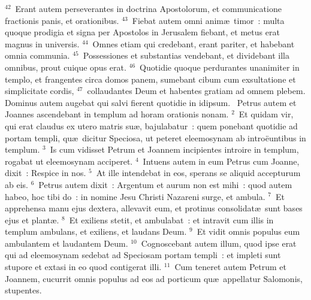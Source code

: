 ${}^{42}$~Erant autem perseverantes in doctrina Apostolorum, et communicatione fractionis panis, et orationibus.
${}^{43}$~Fiebat autem omni anim\ae\ timor~: multa quoque prodigia et signa per Apostolos in Jerusalem fiebant, et metus erat magnus in universis.
${}^{44}$~Omnes etiam qui credebant, erant pariter, et habebant omnia communia.
${}^{45}$~Possessiones et substantias vendebant, et dividebant illa omnibus, prout cuique opus erat.
${}^{46}$~Quotidie quoque perdurantes unanimiter in templo, et frangentes circa domos panem, sumebant cibum cum exsultatione et simplicitate cordis,
${}^{47}$~collaudantes Deum et habentes gratiam ad omnem plebem. Dominus autem augebat qui salvi fierent quotidie in idipsum.
~Petrus autem et Joannes ascendebant in templum ad horam orationis nonam.
${}^{2}$~Et quidam vir, qui erat claudus ex utero matris su\ae , bajulabatur~: quem ponebant quotidie ad portam templi, qu\ae\ dicitur Speciosa, ut peteret eleemosynam ab intro\"euntibus in templum.
${}^{3}$~Is cum vidisset Petrum et Joannem incipientes introire in templum, rogabat ut eleemosynam acciperet.
${}^{4}$~Intuens autem in eum Petrus cum Joanne, dixit~: Respice in nos.
${}^{5}$~At ille intendebat in eos, sperans se aliquid accepturum ab eis.
${}^{6}$~Petrus autem dixit~: Argentum et aurum non est mihi~: quod autem habeo, hoc tibi do~: in nomine Jesu Christi Nazareni surge, et ambula.
${}^{7}$~Et apprehensa manu ejus dextera, allevavit eum, et protinus consolidat\ae\ sunt bases ejus et plant\ae .
${}^{8}$~Et exiliens stetit, et ambulabat~: et intravit cum illis in templum ambulans, et exiliens, et laudans Deum.
${}^{9}$~Et vidit omnis populus eum ambulantem et laudantem Deum.
${}^{10}$~Cognoscebant autem illum, quod ipse erat qui ad eleemosynam sedebat ad Speciosam portam templi~: et impleti sunt stupore et extasi in eo quod contigerat illi.
${}^{11}$~Cum teneret autem Petrum et Joannem, cucurrit omnis populus ad eos ad porticum qu\ae\ appellatur Salomonis, stupentes.


